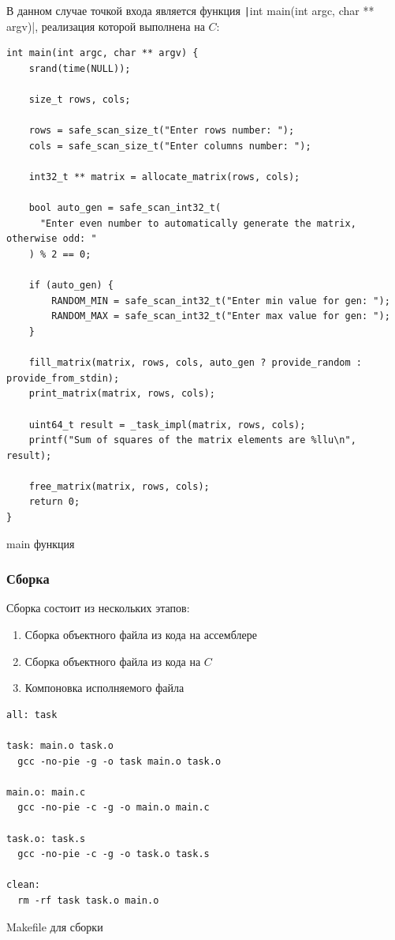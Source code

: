 \documentclass[a4paper]{article}
\begin{document}
  В данном случае точкой входа является функция \texttt|int main(int argc, char ** argv)|,
  реализация которой выполнена на $C$:
  \begin{listing}[H]
    \begin{verbatim}
int main(int argc, char ** argv) {
    srand(time(NULL));

    size_t rows, cols;

    rows = safe_scan_size_t("Enter rows number: ");
    cols = safe_scan_size_t("Enter columns number: ");

    int32_t ** matrix = allocate_matrix(rows, cols);

    bool auto_gen = safe_scan_int32_t(
      "Enter even number to automatically generate the matrix, otherwise odd: "
    ) % 2 == 0;

    if (auto_gen) {
        RANDOM_MIN = safe_scan_int32_t("Enter min value for gen: ");
        RANDOM_MAX = safe_scan_int32_t("Enter max value for gen: ");
    }

    fill_matrix(matrix, rows, cols, auto_gen ? provide_random : provide_from_stdin);
    print_matrix(matrix, rows, cols);

    uint64_t result = _task_impl(matrix, rows, cols);
    printf("Sum of squares of the matrix elements are %llu\n", result);

    free_matrix(matrix, rows, cols);
    return 0;
}
    \end{verbatim}
    \caption{main функция}
  \end{listing}
  
  \subsubsection{Сборка}

  Сборка состоит из нескольких этапов:
  \begin{enumerate}
    \item Сборка объектного файла из кода на ассемблере
    \item Сборка объектного файла из кода на $C$
    \item Компоновка исполняемого файла
  \end{enumerate}

  \begin{listing}[H]
    \begin{verbatim}
all: task

task: main.o task.o
  gcc -no-pie -g -o task main.o task.o

main.o: main.c
  gcc -no-pie -c -g -o main.o main.c

task.o: task.s
  gcc -no-pie -c -g -o task.o task.s

clean:
  rm -rf task task.o main.o
    \end{verbatim}
    \caption{Makefile для сборки}
  \end{listing}
\end{document}
